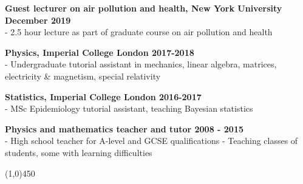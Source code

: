\noindent \textbf{Guest lecturer on air pollution and health, New York University \hfill December 2019}\\
\noindent - 2.5 hour lecture as part of graduate course on air pollution and health \bigskip

\noindent \textbf{Physics, Imperial College London \hfill 2017-2018}\\
\noindent - Undergraduate tutorial assistant in mechanics, linear algebra, matrices, electricity \& magnetism, special relativity
\bigskip

\noindent \textbf{Statistics, Imperial College London \hfill 2016-2017}\\
- MSc Epidemiology tutorial assistant, teaching Bayesian statistics
\bigskip

\noindent \textbf{Physics and mathematics teacher and tutor \hfill 2008 - 2015}\\
- High school teacher for A-level and GCSE qualifications
- Teaching classes of students, some with learning difficulties	

\begin{center} \line(1,0){450} \end{center}